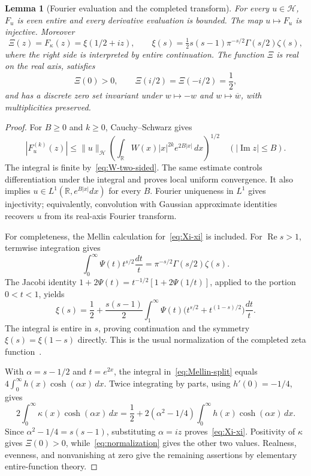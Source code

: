 \documentclass[11pt,a4paper]{article}
\numberwithin{equation}{section}
\newtheorem{lemma}[theorem]{Lemma}
\theoremstyle{definition}
\theoremstyle{remark}
\newcommand{\R}{\mathbb R}
\newcommand{\Hh}{\mathcal H}
\newcommand{\norm}[1]{\lVert #1\rVert}
\begin{document}
\begin{lemma}[Fourier evaluation and the completed transform]\label{lem:Fourier}
For every $u\in\Hh$, $F_u$ is even entire and every derivative evaluation is bounded. The map $u\mapsto F_u$ is injective. Moreover
\begin{equation}\label{eq:Xi-xi}
 \Xi(z)=F_\kappa(z)=\xi(1/2+iz),\qquad
 \xi(s)=\tfrac12s(s-1)\pi^{-s/2}\Gamma(s/2)\zeta(s),
\end{equation}
where the right side is interpreted by entire continuation. The function $\Xi$ is real on the real axis, satisfies
\begin{equation}\label{eq:special-values}
 \Xi(0)>0,\qquad \Xi(i/2)=\Xi(-i/2)=\frac12,
\end{equation}
and has a discrete zero set invariant under $w\mapsto-w$ and $w\mapsto\overline w$, with multiplicities preserved.
\end{lemma}
\begin{proof}
For $B\ge0$ and $k\ge0$, Cauchy--Schwarz gives
\begin{equation}\label{eq:eval-bound}
 |F_u^{(k)}(z)|\le\norm{u}_{\Hh}
 \left(\int_\R W(x)|x|^{2k}e^{2B|x|}\,dx\right)^{1/2}
 \quad(|\operatorname{Im}z|\le B).
\end{equation}
The integral is finite by~\eqref{eq:W-two-sided}. The same estimate controls differentiation under the integral and proves local uniform convergence. It also implies $u\in L^1(\R,e^{B|x|}dx)$ for every $B$. Fourier uniqueness in $L^1$ gives injectivity; equivalently, convolution with Gaussian approximate identities recovers $u$ from its real-axis Fourier transform.

For completeness, the Mellin calculation for~\eqref{eq:Xi-xi} is included. For $\operatorname{Re}s>1$, termwise integration gives
\[
 \int_0^\infty\Psi(t)t^{s/2}\frac{dt}{t}
 =\pi^{-s/2}\Gamma(s/2)\zeta(s).
\]
The Jacobi identity $1+2\Psi(t)=t^{-1/2}[1+2\Psi(1/t)]$, applied to the portion $0<t<1$, yields
\begin{equation}\label{eq:Mellin-split}
 \xi(s)=\frac12+\frac{s(s-1)}2
 \int_1^\infty\Psi(t)\bigl(t^{s/2}+t^{(1-s)/2}\bigr)\frac{dt}{t}.
\end{equation}
The integral is entire in $s$, proving continuation and the symmetry $\xi(s)=\xi(1-s)$ directly. This is the usual normalization of the completed zeta function~\cite{DLMFzeta}.

With $\alpha=s-1/2$ and $t=e^{2x}$, the integral in~\eqref{eq:Mellin-split} equals
$4\int_0^\infty h(x)\cosh(\alpha x)\,dx$. Twice integrating by parts, using $h'(0)=-1/4$, gives
\[
 2\int_0^\infty\kappa(x)\cosh(\alpha x)\,dx
 =\frac12+2(\alpha^2-1/4)\int_0^\infty h(x)\cosh(\alpha x)\,dx.
\]
Since $\alpha^2-1/4=s(s-1)$, substituting $\alpha=iz$ proves~\eqref{eq:Xi-xi}. Positivity of $\kappa$ gives $\Xi(0)>0$, while~\eqref{eq:normalization} gives the other two values. Realness, evenness, and nonvanishing at zero give the remaining assertions by elementary entire-function theory.
\end{proof}
\end{document}
